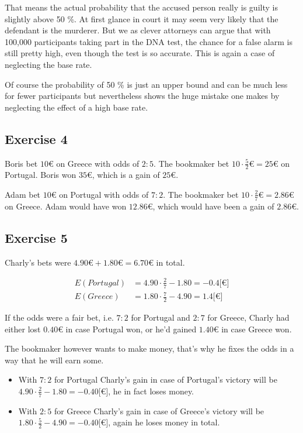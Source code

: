 That means the actual probability that the accused person really is guilty is slightly above 50 \%. At first glance in court it may seem very likely that the defendant is the murderer. But we as clever attorneys can argue that with 100,000 participants taking part in the DNA test, the chance for a false alarm is still pretty high, even though the test is so accurate. This is again a case of neglecting the base rate. 

\bigskip

Of course the probability of 50 \% is just an upper bound and can be much less for fewer participants but nevertheless shows the huge mistake one makes by neglecting the effect of a high base rate.  

\subsection*{Exercise 4}
Boris bet $10\euro$ on Greece with odds of $2 : 5$. The bookmaker bet $10\cdot\frac{5}{2}\euro=25\euro$ on Portugal. Boris won $35\euro$, which is a gain of $25\euro$.

Adam bet $10\euro$ on Portugal with odds of $7 : 2$. The bookmaker bet $10\cdot\frac{2}{7}\euro=2.86\euro$ on Greece. Adam would have won $12.86\euro$, which would have been a gain of $2.86\euro$.

\subsection*{Exercise 5}
Charly's bets were $4.90\euro+1.80\euro=6.70\euro$ in total.

\begin{align*}
E(Portugal) &= 4.90 \cdot \frac{2}{7} - 1.80 = -0.4 {[}\euro{]} \\
E(Greece)   &= 1.80 \cdot \frac{7}{2} - 4.90 =  1.4 {[}\euro{]}
\end{align*}

If the odds were a fair bet, i.e. $7 : 2$ for Portugal and $2 : 7$ for Greece, Charly had either lost $0.40\euro$ in case Portugal won, or he'd gained $1.40\euro$ in case Greece won.

\bigskip

The bookmaker however wants to make money, that's why he fixes the odds in a way that he will earn some.

\begin{itemize}
	\item[] With $7 : 2$ for Portugal Charly's gain in case of Portugal's victory will be $4.90 \cdot \frac{2}{7} - 1.80 = -0.40 {[}\euro{]}$, he in fact loses money.
  \item[] With $2 : 5$ for Greece Charly's gain in case of Greece's victory will be $1.80 \cdot \frac{5}{2} - 4.90 = -0.40 {[}\euro{]}$, again he loses money in total.
\end{itemize}

